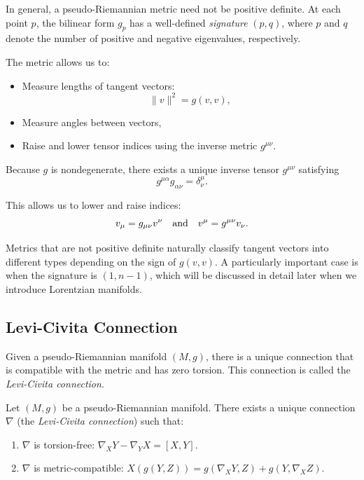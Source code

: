 In general, a pseudo-Riemannian metric need not be positive definite. At each point $p$, the bilinear form $g_p$ has a well-defined \emph{signature} $(p, q)$, where $p$ and $q$ denote the number of positive and negative eigenvalues, respectively.

The metric allows us to:

\begin{itemize}
  \item Measure lengths of tangent vectors:
    \[%
      \|v\|^2 = g(v,v)
    ,\]%
  \item Measure angles between vectors,
  \item Raise and lower tensor indices using the inverse metric $g^{\mu\nu}$.
\end{itemize}

Because $g$ is nondegenerate, there exists a unique inverse tensor $g^{\mu\nu}$ satisfying
\[%
  g^{\mu\alpha} g_{\alpha\nu} = \delta^\mu_{\nu}
.\]%

This allows us to lower and raise indices:
\[%
  v_\mu = g_{\mu\nu} v^\nu \aand v^\mu = g^{\mu\nu} v_\nu
.\]%

Metrics that are not positive definite naturally classify tangent vectors into different types depending on the sign of $g(v, v)$. A particularly important case is when the signature is $(1, n-1)$, which will be discussed in detail later when we introduce Lorentzian manifolds.

\subsection{Levi-Civita Connection}

Given a pseudo-Riemannian manifold $(M, g)$, there is a unique connection that is compatible with the metric and has zero torsion. This connection is called the \emph{Levi-Civita connection}.

\begin{theorem}
  Let $(M, g)$ be a pseudo-Riemannian manifold. There exists a unique connection $\nabla$ (the \emph{Levi-Civita connection}) such that:
  \begin{enumerate}
    \item $\nabla$ is torsion-free: $\nabla_X Y - \nabla_Y X = [X,Y]$.
    \item $\nabla$ is metric-compatible: $X(g(Y,Z)) = g(\nabla_X Y, Z) + g(Y, \nabla_X Z)$.
  \end{enumerate}
\end{theorem}

